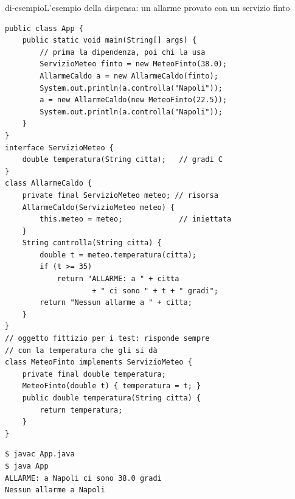 \begin{programma}{di-esempio}{L'esempio della dispensa: un allarme provato con un servizio finto}
\begin{lstlisting}[style=javacs, name=App.java]
public class App {
    public static void main(String[] args) {
        // prima la dipendenza, poi chi la usa
        ServizioMeteo finto = new MeteoFinto(38.0);
        AllarmeCaldo a = new AllarmeCaldo(finto);
        System.out.println(a.controlla("Napoli"));
        a = new AllarmeCaldo(new MeteoFinto(22.5));
        System.out.println(a.controlla("Napoli"));
    }
}
interface ServizioMeteo {
    double temperatura(String citta);   // gradi C
}
class AllarmeCaldo {
    private final ServizioMeteo meteo; // risorsa
    AllarmeCaldo(ServizioMeteo meteo) {
        this.meteo = meteo;             // iniettata
    }
    String controlla(String citta) {
        double t = meteo.temperatura(citta);
        if (t >= 35)
            return "ALLARME: a " + citta
                    + " ci sono " + t + " gradi";
        return "Nessun allarme a " + citta;
    }
}
// oggetto fittizio per i test: risponde sempre
// con la temperatura che gli si dà
class MeteoFinto implements ServizioMeteo {
    private final double temperatura;
    MeteoFinto(double t) { temperatura = t; }
    public double temperatura(String citta) {
        return temperatura;
    }
}
\end{lstlisting}
\tcblower
{}

\medskip
\begin{lstlisting}[style=shellcs, name=Terminale]
$ javac App.java
$ java App
ALLARME: a Napoli ci sono 38.0 gradi
Nessun allarme a Napoli
\end{lstlisting}
\end{programma}
